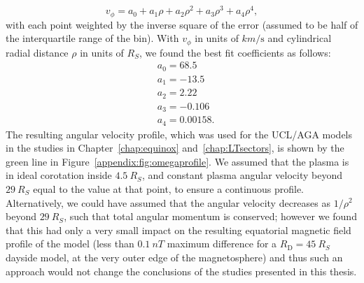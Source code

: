 \begin{equation} \label{appendix:eq:fourthorderpolyv}
v_\phi = a_0 + a_1\rho + a_2\rho^2 + a_3\rho^3 + a_4\rho^4,
\end{equation}
with each point weighted by the inverse square of the error (assumed to be half of the interquartile range of the bin). With $v_\phi$ in units of $\si{km\per\second}$ and cylindrical radial distance $\rho$ in units of $\si{R_S}$, we found the best fit coefficients as follows:
\begin{align}
& a_0 = 68.5 \\
& a_1 = -13.5 \nonumber \\
& a_2 = 2.22 \nonumber \\
& a_3 = -0.106 \nonumber \\
& a_4 = 0.00158. \nonumber
\end{align}
The resulting angular velocity profile, which was used for the UCL/AGA models in the studies in Chapter~\ref{chap:equinox} and~\ref{chap:LTsectors}, is shown by the green line in Figure~\ref{appendix:fig:omegaprofile}. We assumed that the plasma is in ideal corotation inside $\SI{4.5}{R_S}$, and constant plasma angular velocity beyond $\SI{29}{R_S}$ equal to the value at that point, to ensure a continuous profile. Alternatively, we could have assumed that the angular velocity decreases as $1/\rho^2$ beyond $\SI{29}{R_S}$, such that total angular momentum is conserved; however we found that this had only a very small impact on the resulting equatorial magnetic field profile of the model (less than $\SI{0.1}{nT}$ maximum difference for a $R_\mathrm{D} = \SI{45}{R_S}$ dayside model, at the very outer edge of the magnetosphere) and thus such an approach would not change the conclusions of the studies presented in this thesis.


